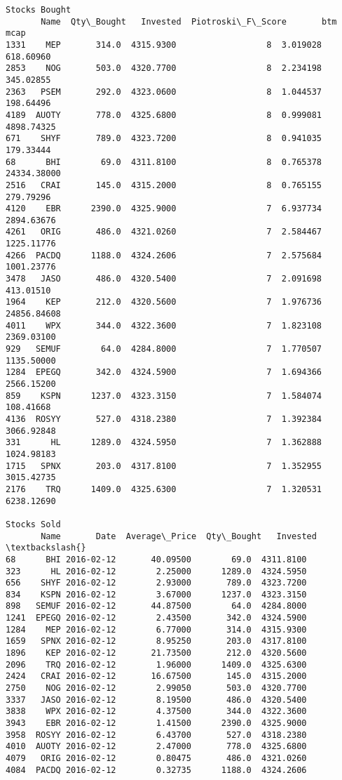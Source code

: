 \documentclass[11pt]{article}
\begin{document}
\begin{Verbatim}[commandchars=\\\{\}]
Stocks Bought
       Name  Qty\_Bought   Invested  Piotroski\_F\_Score       btm         mcap
1331    MEP       314.0  4315.9300                  8  3.019028    618.60960
2853    NOG       503.0  4320.7700                  8  2.234198    345.02855
2363   PSEM       292.0  4323.0600                  8  1.044537    198.64496
4189  AUOTY       778.0  4325.6800                  8  0.999081   4898.74325
671    SHYF       789.0  4323.7200                  8  0.941035    179.33444
68      BHI        69.0  4311.8100                  8  0.765378  24334.38000
2516   CRAI       145.0  4315.2000                  8  0.765155    279.79296
4120    EBR      2390.0  4325.9000                  7  6.937734   2894.63676
4261   ORIG       486.0  4321.0260                  7  2.584467   1225.11776
4266  PACDQ      1188.0  4324.2606                  7  2.575684   1001.23776
3478   JASO       486.0  4320.5400                  7  2.091698    413.01510
1964    KEP       212.0  4320.5600                  7  1.976736  24856.84608
4011    WPX       344.0  4322.3600                  7  1.823108   2369.03100
929   SEMUF        64.0  4284.8000                  7  1.770507   1135.50000
1284  EPEGQ       342.0  4324.5900                  7  1.694366   2566.15200
859    KSPN      1237.0  4323.3150                  7  1.584074    108.41668
4136  ROSYY       527.0  4318.2380                  7  1.392384   3066.92848
331      HL      1289.0  4324.5950                  7  1.362888   1024.98183
1715   SPNX       203.0  4317.8100                  7  1.352955   3015.42735
2176    TRQ      1409.0  4325.6300                  7  1.320531   6238.12690

Stocks Sold
       Name       Date  Average\_Price  Qty\_Bought   Invested  \textbackslash{}
68      BHI 2016-02-12       40.09500        69.0  4311.8100
323      HL 2016-02-12        2.25000      1289.0  4324.5950
656    SHYF 2016-02-12        2.93000       789.0  4323.7200
834    KSPN 2016-02-12        3.67000      1237.0  4323.3150
898   SEMUF 2016-02-12       44.87500        64.0  4284.8000
1241  EPEGQ 2016-02-12        2.43500       342.0  4324.5900
1284    MEP 2016-02-12        6.77000       314.0  4315.9300
1659   SPNX 2016-02-12        8.95250       203.0  4317.8100
1896    KEP 2016-02-12       21.73500       212.0  4320.5600
2096    TRQ 2016-02-12        1.96000      1409.0  4325.6300
2424   CRAI 2016-02-12       16.67500       145.0  4315.2000
2750    NOG 2016-02-12        2.99050       503.0  4320.7700
3337   JASO 2016-02-12        8.19500       486.0  4320.5400
3838    WPX 2016-02-12        4.37500       344.0  4322.3600
3943    EBR 2016-02-12        1.41500      2390.0  4325.9000
3958  ROSYY 2016-02-12        6.43700       527.0  4318.2380
4010  AUOTY 2016-02-12        2.47000       778.0  4325.6800
4079   ORIG 2016-02-12        0.80475       486.0  4321.0260
4084  PACDQ 2016-02-12        0.32735      1188.0  4324.2606


\end{Verbatim}
\end{document}

